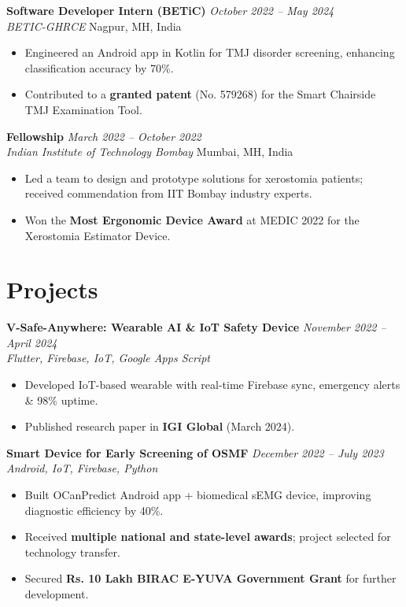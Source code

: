 \documentclass[10pt, letterpaper]{article}
\begin{document}
\vspace{4pt}
\textbf{Software Developer Intern (BETiC)} \hfill \textit{October 2022 -- May 2024} \\
\textit{BETIC-GHRCE} \hfill Nagpur, MH, India
\begin{itemize}[leftmargin=*, noitemsep, topsep=2pt]
    \item Engineered an Android app in Kotlin for TMJ disorder screening, enhancing classification accuracy by 70\%.
    \item Contributed to a \textbf{granted patent} (No. 579268) for the Smart Chairside TMJ Examination Tool.
\end{itemize}

\vspace{4pt}
\textbf{Fellowship} \hfill \textit{March 2022 -- October 2022} \\
\textit{Indian Institute of Technology Bombay} \hfill Mumbai, MH, India
\begin{itemize}[leftmargin=*, noitemsep, topsep=2pt]
    \item Led a team to design and prototype solutions for xerostomia patients; received commendation from IIT Bombay industry experts.
    \item Won the \textbf{Most Ergonomic Device Award} at MEDIC 2022 for the Xerostomia Estimator Device.
\end{itemize}

\section{Projects}

\textbf{V-Safe-Anywhere: Wearable AI \& IoT Safety Device} \hfill \textit{November 2022 -- April 2024} \\
\textit{Flutter, Firebase, IoT, Google Apps Script}
\begin{itemize}[leftmargin=*, noitemsep, topsep=2pt]
    \item Developed IoT-based wearable with real-time Firebase sync, emergency alerts \& 98\% uptime.
    \item Published research paper in \textbf{IGI Global} (March 2024).
\end{itemize}

\vspace{4pt}
\textbf{Smart Device for Early Screening of OSMF} \hfill \textit{December 2022 -- July 2023} \\
\textit{Android, IoT, Firebase, Python}
\begin{itemize}[leftmargin=*, noitemsep, topsep=2pt]
    \item Built OCanPredict Android app + biomedical sEMG device, improving diagnostic efficiency by 40\%.
    \item Received \textbf{multiple national and state-level awards}; project selected for technology transfer.
    \item Secured \textbf{Rs. 10 Lakh BIRAC E-YUVA Government Grant} for further development.
\end{itemize}
\end{document}
